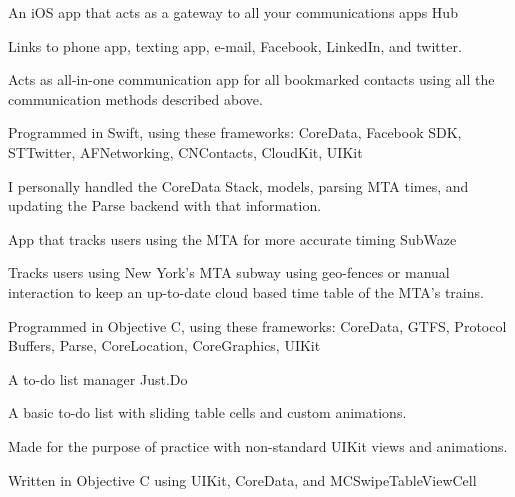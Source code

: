 

\begin{cventries}

  \cventry
    {An iOS app that acts as a gateway to all your communications apps}
    {Hub} %
    {} %
    {} %
    {
      \begin{cvitems}
        \item {Links to phone app, texting app, e-mail, Facebook, LinkedIn, and twitter.}
        \item {Acts as all-in-one communication app for all bookmarked contacts using all the communication methods described above.}
        \item {Programmed in Swift, using these frameworks: CoreData, Facebook SDK, STTwitter, AFNetworking, CNContacts, CloudKit, UIKit}
        \item {I personally handled the CoreData Stack, models, parsing MTA times, and updating the Parse backend with that information.}
      \end{cvitems}
    }

  \cventry
    {App that tracks users using the MTA for more accurate timing}
    {SubWaze} %
    {} %
    {} %
    {
      \begin{cvitems} %
        \item {Tracks users using New York's MTA subway using geo-fences or manual interaction to keep an up-to-date cloud based time table of the MTA's trains.}
        \item {Programmed in Objective C, using these frameworks: CoreData, GTFS, Protocol Buffers, Parse, CoreLocation, CoreGraphics, UIKit}
      \end{cvitems}
    }

    \cventry
      {A to-do list manager}
      {Just.Do}
      {}
      {}
      {
        \begin{cvitems}
          \item {A basic to-do list with sliding table cells and custom animations.}
          \item {Made for the purpose of practice with non-standard UIKit views and animations.}
          \item {Written in Objective C using UIKit, CoreData, and MCSwipeTableViewCell}
          \end{cvitems}
      }


\end{cventries}
